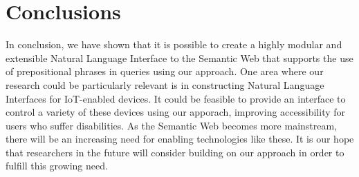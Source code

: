 \documentclass[../main.tex]{subfiles}
\begin{document}
\chapter{Conclusions}

In conclusion, we have shown that it is possible to create a highly modular and extensible Natural Language Interface to the Semantic Web that supports the use of prepositional phrases in queries using our approach.  One area where our research could be particularly relevant is in constructing Natural Language Interfaces for IoT-enabled devices.  It could be feasible to provide an interface to control a variety of these devices using our apporach, improving accessibility for users who suffer disabilities.  As the Semantic Web becomes more mainstream, there will be an increasing need for enabling technologies like these.  It is our hope that researchers in the future will consider building on our approach in order to fulfill this growing need.
\end{document}
